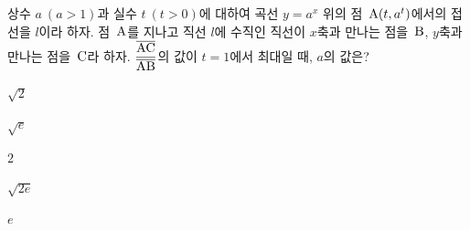 상수 $a\ (a>1)$과 실수 $t\ (t>0)$에 대하여 곡선 $y=a^x$ 위의 점~$\mathrm{A}(t{,}\mkern3mu\mathopen{}a^t)$에서의 접선을 $l$이라 하자. 점~$\mathrm{A}$를 지나고 직선 $l$에 수직인 직선이 $x$축과 만나는 점을~$\mathrm{B}$, $y$축과 만나는 점을~$\mathrm{C}$라 하자. $\dfrac{\overline{\mathrm{AC}}}{\overline{\mathrm{AB}}}$의 값이 $t=1$에서 최대일 때, $a$의 값은?
\begin{choices32}{\rule[-3ex]{0pt}{8ex}$\sqrt{2}$}{\rule[-3ex]{0pt}{8ex}$\sqrt{e}$}{\rule[-3ex]{0pt}{8ex}$2$}{\rule[-3ex]{0pt}{8ex}$\sqrt{2e}$}{\rule[-3ex]{0pt}{8ex}$e$}\end{choices32}
